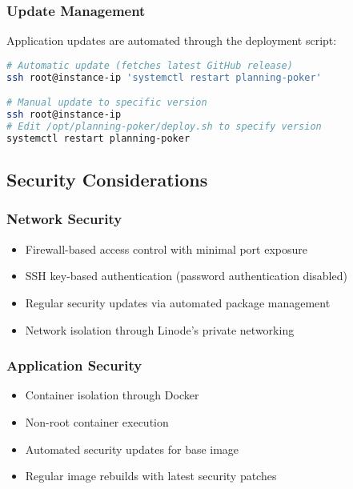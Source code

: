 \documentclass[11pt,a4paper]{article}
\begin{document}
\subsubsection{Update Management}

Application updates are automated through the deployment script:

\begin{lstlisting}[language=bash, caption=Update Process]
# Automatic update (fetches latest GitHub release)
ssh root@instance-ip 'systemctl restart planning-poker'

# Manual update to specific version
ssh root@instance-ip
# Edit /opt/planning-poker/deploy.sh to specify version
systemctl restart planning-poker
\end{lstlisting}

\subsection{Security Considerations}

\subsubsection{Network Security}

\begin{itemize}
    \item Firewall-based access control with minimal port exposure
    \item SSH key-based authentication (password authentication disabled)
    \item Regular security updates via automated package management
    \item Network isolation through Linode's private networking
\end{itemize}

\subsubsection{Application Security}

\begin{itemize}
    \item Container isolation through Docker
    \item Non-root container execution
    \item Automated security updates for base image
    \item Regular image rebuilds with latest security patches
\end{itemize}
\end{document}
